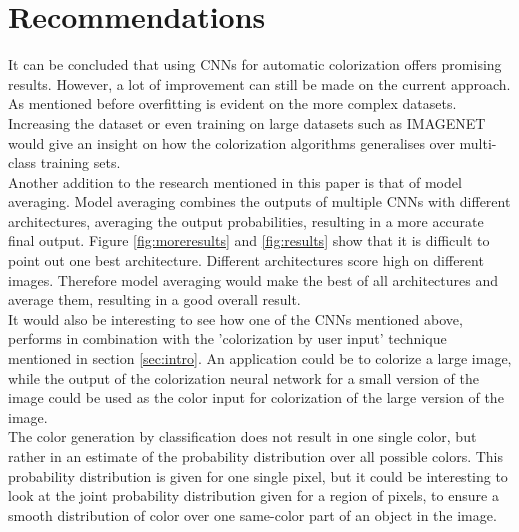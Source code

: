 \section{Recommendations}


It can be concluded that using CNNs for automatic colorization offers promising results. However, a lot of improvement can still be made on the current approach. As mentioned before overfitting is evident on the more complex datasets. Increasing the dataset or even training on large datasets such as IMAGENET \cite{deng2009imagenet} would give an insight on how the colorization algorithms generalises over multi-class training sets.\\

Another addition to the research mentioned in this paper is that of model averaging. Model averaging combines the outputs of multiple CNNs with different architectures, averaging the output probabilities, resulting in a more accurate final output. Figure \ref{fig:moreresults} and \ref{fig:results} show that it is difficult to point out one best architecture. Different architectures score high on different images. Therefore model averaging would make the best of all architectures and average them, resulting in a good overall result.\\

It would also be interesting to see how one of the CNNs mentioned above, performs in combination with the 'colorization by user input' technique mentioned in section \ref{sec:intro}. An application could be to colorize a large image, while the output of the colorization neural network for a small version of the image could be used as the color input for colorization of the large version of the image.\\

The color generation by classification does not result in one single color, but rather in an estimate of the probability distribution over all possible colors. This probability distribution is given for one single pixel, but it could be interesting to look at the joint probability distribution given for a region of pixels, to ensure a smooth distribution of color over one same-color part of an object in the image.


